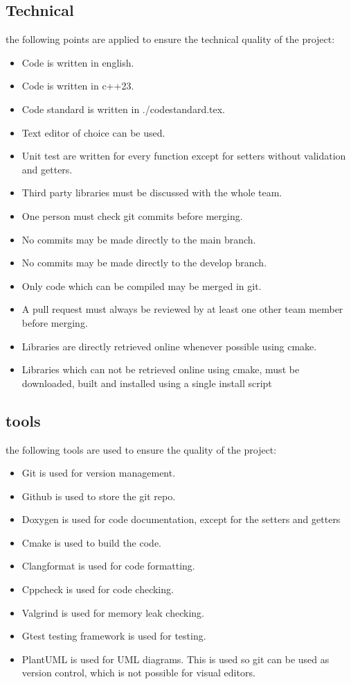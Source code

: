 \documentclass{article} %
\begin{document}
\subsection{Technical}
the following points are applied to ensure the technical quality of the project:
\begin{itemize}
    \item Code is written in english.
    \item Code is written in c++23.
    \item Code standard is written in ./codestandard.tex.
    \item Text editor of choice can be used.
    \item Unit test are written for every function except for setters without validation and getters.
    \item Third party libraries must be discussed with the whole team.
    \item One person must check git commits before merging.
    \item No commits may be made directly to the main branch.
    \item No commits may be made directly to the develop branch.
    \item Only code which can be compiled may be merged in git.
    \item A pull request must always be reviewed by at least one other team member before merging.
    \item Libraries are directly retrieved online whenever possible using cmake.
    \item Libraries which can not be retrieved online using cmake, must be downloaded, built and installed using a single install script
\end{itemize}

\subsection{tools}
the following tools are used to ensure the quality of the project:
\begin{itemize}
    \item Git is used for version management.
    \item Github is used to store the git repo.
    \item Doxygen is used for code documentation, except for the setters and getters
    \item Cmake is used to build the code.
    \item Clangformat is used for code formatting.
    \item Cppcheck is used for code checking.
    \item Valgrind is used for memory leak checking.
    \item Gtest testing framework is used for testing.
    \item PlantUML is used for UML diagrams. This is used so git can be used as version control, which is not possible for visual editors.
\end{itemize}
\newpage
\end{document}
